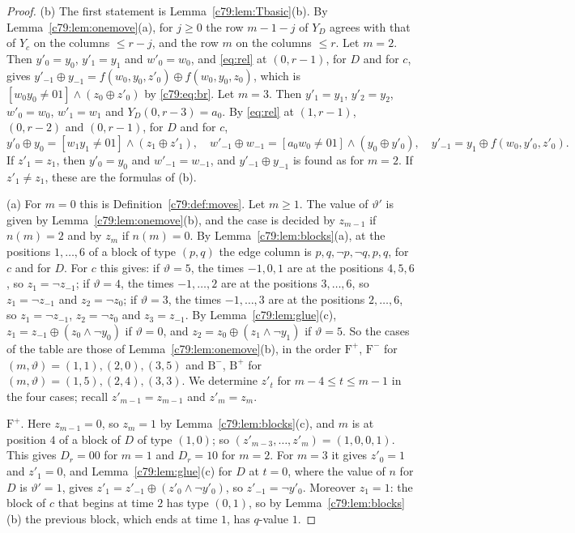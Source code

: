 \begin{proof}
(b) The first statement is Lemma~\ref{c79:lem:Tbasic}(b). By Lemma~\ref{c79:lem:onemove}(a), for $j\ge0$ the row $m-1-j$ of $Y_D$ agrees with that of $Y_c$ on the columns $\le r-j$, and the row $m$ on the columns $\le r$. Let $m=2$. Then $y'_0=y_0$, $y'_1=y_1$ and $w'_0=w_0$, and \eqref{eq:rel} at $(0,r-1)$, for $D$ and for $c$, gives $y'_{-1}\oplus y_{-1}=f(w_0,y_0,z'_0)\oplus f(w_0,y_0,z_0)$, which is $[w_0y_0\ne01]\wedge(z_0\oplus z'_0)$ by \eqref{c79:eq:br}. Let $m=3$. Then $y'_1=y_1$, $y'_2=y_2$, $w'_0=w_0$, $w'_1=w_1$ and $Y_D(0,r-3)=a_0$. By \eqref{eq:rel} at $(1,r-1)$, $(0,r-2)$ and $(0,r-1)$, for $D$ and for $c$,
\[
y'_0\oplus y_0=[w_1y_1\ne01]\wedge(z_1\oplus z'_1),\quad w'_{-1}\oplus w_{-1}=[a_0w_0\ne01]\wedge(y_0\oplus y'_0),\quad y'_{-1}=y_1\oplus f(w_0,y'_0,z'_0).
\]
If $z'_1=z_1$, then $y'_0=y_0$ and $w'_{-1}=w_{-1}$, and $y'_{-1}\oplus y_{-1}$ is found as for $m=2$. If $z'_1\ne z_1$, these are the formulas of (b).

(a) For $m=0$ this is Definition~\ref{c79:def:moves}. Let $m\ge1$. The value of $\vartheta'$ is given by Lemma~\ref{c79:lem:onemove}(b), and the case is decided by $z_{m-1}$ if $n(m)=2$ and by $z_m$ if $n(m)=0$. By Lemma~\ref{c79:lem:blocks}(a), at the positions $1,\dots,6$ of a block of type $(p,q)$ the edge column is $p,q,\neg p,\neg q,p,q$, for $c$ and for $D$. For $c$ this gives: if $\vartheta=5$, the times $-1,0,1$ are at the positions $4,5,6$, so $z_1=\neg z_{-1}$; if $\vartheta=4$, the times $-1,\dots,2$ are at the positions $3,\dots,6$, so $z_1=\neg z_{-1}$ and $z_2=\neg z_0$; if $\vartheta=3$, the times $-1,\dots,3$ are at the positions $2,\dots,6$, so $z_1=\neg z_{-1}$, $z_2=\neg z_0$ and $z_3=z_{-1}$. By Lemma~\ref{c79:lem:glue}(c), $z_1=z_{-1}\oplus(z_0\wedge\neg y_0)$ if $\vartheta=0$, and $z_2=z_0\oplus(z_1\wedge\neg y_1)$ if $\vartheta=5$. So the cases of the table are those of Lemma~\ref{c79:lem:onemove}(b), in the order $\mathrm F^+$, $\mathrm F^-$ for $(m,\vartheta)=(1,1),(2,0),(3,5)$ and $\mathrm B^-$, $\mathrm B^+$ for $(m,\vartheta)=(1,5),(2,4),(3,3)$. We determine $z'_t$ for $m-4\le t\le m-1$ in the four cases; recall $z'_{m-1}=z_{m-1}$ and $z'_m=z_m$.

$\mathrm F^+$. Here $z_{m-1}=0$, so $z_m=1$ by Lemma~\ref{c79:lem:blocks}(c), and $m$ is at position $4$ of a block of $D$ of type $(1,0)$; so $(z'_{m-3},\dots,z'_m)=(1,0,0,1)$. This gives $D_r=00$ for $m=1$ and $D_r=10$ for $m=2$. For $m=3$ it gives $z'_0=1$ and $z'_1=0$, and Lemma~\ref{c79:lem:glue}(c) for $D$ at $t=0$, where the value of $n$ for $D$ is $\vartheta'=1$, gives $z'_1=z'_{-1}\oplus(z'_0\wedge\neg y'_0)$, so $z'_{-1}=\neg y'_0$. Moreover $z_1=1$: the block of $c$ that begins at time $2$ has type $(0,1)$, so by Lemma~\ref{c79:lem:blocks}(b) the previous block, which ends at time $1$, has $q$-value $1$.


\end{proof}
